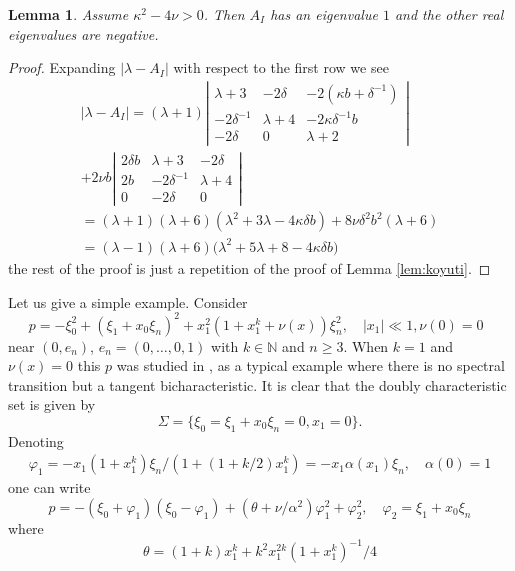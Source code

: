 \documentclass[12pt,leqno]{article} %
\def\al{\alpha}
\def\N{{\mathbb N}}
\def\la{\lambda}
\def\N{\mathbb{N}}
\numberwithin{equation}{section}
\newtheorem{lem}{Lemma}[section]
\begin{document}
%
\begin{lem}
\label{lem:koyuti:dep} Assume $\kappa^2-4\nu> 0$. Then
$A_I$ has an eigenvalue $1$ and the other real eigenvalues are negative.
%
\end{lem}
%
\begin{proof} Expanding $|\la-A_I|$ with respect to the first row we see
%
\begin{gather*}
|\lambda-A_I|=(\la+1)\left|
\begin{array}{ccc}
\la+3&-2\delta&-2(\kappa b+\delta^{-1})\\
-2\delta^{-1}&\la+4&-2\kappa \delta^{-1} b\\
-2\delta&0&\la+2
\end{array}\right|\\
+2\nu b \left|
\begin{array}{ccc}
2\delta b&\la+3&-2\delta\\
2b&-2\delta^{-1}&\la+4\\
0&-2\delta &0
\end{array}\right|\\
=(\la+1)(\la+6)(\la^2+3\la-4\kappa \delta b)+8\nu \delta^2 b^2(\la+6)\\
=(\la-1)(\la+6)\big(\la^2+5\la+8-4\kappa\delta b\big)
\end{gather*}
%
the rest of the proof is just a repetition of the proof of Lemma \ref{lem:koyuti}.
%
\end{proof}
%
Let us give a simple example. Consider
%
\begin{equation}
\label{eq:rei:3}
p=-\xi_0^2+(\xi_1+x_0\xi_n)^2+x_1^2(1+x_1^k+\nu(x))\xi_n^2,\quad |x_1|\ll1,\nu(0)=0\;\;
\end{equation}
%
%
near $(0, e_n)$, $e_n=(0,\ldots,0,1)$ with $ k\in\N$ and $n\geq 3$. When $k=1$ and $\nu(x)=0$  this $p$ was studied in \cite{MR2438425}, \cite{MR3726883} as a typical example where there is no spectral transition but a tangent bicharacteristic. It is clear that the doubly characteristic set is given by
%
\[
\Sigma=\{\xi_0=\xi_1+x_0\xi_n=0, x_1=0\}.
\]
%
Denoting 
%
\begin{gather*}
\varphi_1=-x_1(1+x_1^k)\xi_n/(1+(1+k/2)x_1^k)=-x_1\al(x_1)\xi_n,\quad \al(0)=1 
\end{gather*}
%
one can write
%
\[
p=-(\xi_0+\varphi_1)(\xi_0-\varphi_1)+(\theta+\nu/\al^2)\varphi_1^2+\varphi_2^2,\quad \varphi_2=\xi_1+x_0\xi_n
\]
%
where 
%
\begin{equation}
\label{eq:rei:3:b}
\theta=(1+k)x_1^k+k^2x_1^{2k}(1+x_1^k)^{-1}/4
\end{equation}
\end{document}
